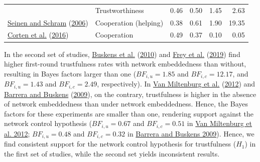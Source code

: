 \documentclass[
  11pt,
]{article}
\begin{document}
\begin{table}
\begin{tabular}[t]{llrrrr}
\addlinespace
 & Trustworthiness & 0.46 & 0.50 & 1.45 & 2.63\\
\addlinespace
\protect\hyperlink{ref-seinen_schram_social_2006}{Seinen and Schram} (\protect\hyperlink{ref-seinen_schram_social_2006}{2006}) & Cooperation (helping) & 0.38 & 0.61 & 1.90 & 19.35\\
\addlinespace
\protect\hyperlink{ref-corten_etal_reputation_2016}{Corten et al.} (\protect\hyperlink{ref-corten_etal_reputation_2016}{2016}) & Cooperation & 0.49 & 0.37 & 0.10 & 0.05\\
\bottomrule
\end{tabular}
\end{table}

In the second set of studies, \protect\hyperlink{ref-buskens_raub_veer_triads_2010}{Buskens et al.} (\protect\hyperlink{ref-buskens_raub_veer_triads_2010}{2010}) and \protect\hyperlink{ref-frey_buskens_investments_2019}{Frey et al.} (\protect\hyperlink{ref-frey_buskens_investments_2019}{2019}) find higher first-round trustfulness rates with network embeddedness than without, resulting in Bayes factors larger than one (\(BF_{i,u} = 1.85\) and \(BF_{i,c} = 12.17\), and \(BF_{i,u} = 1.43\) and \(BF_{i,c} = 2.49\), respectively).
In \protect\hyperlink{ref-miltenburg_buskens_triads_2012}{Van Miltenburg et al.} (\protect\hyperlink{ref-miltenburg_buskens_triads_2012}{2012}) and \protect\hyperlink{ref-barrera_buskens_third_2009}{Barrera and Buskens} (\protect\hyperlink{ref-barrera_buskens_third_2009}{2009}), on the contrary, trustfulness is higher in the absence of network embeddedness than under network embeddedness.
Hence, the Bayes factors for these experiments are smaller than one, rendering support against the network control hypothesis (\(BF_{i,u} = 0.67\) and \(BF_{i,c} = 0.51\) in \protect\hyperlink{ref-miltenburg_buskens_triads_2012}{Van Miltenburg et al. 2012}; \(BF_{i,u} = 0.48\) and \(BF_{i,c} = 0.32\) in \protect\hyperlink{ref-barrera_buskens_third_2009}{Barrera and Buskens 2009}).
Hence, we find consistent support for the network control hypothesis for trustfulness (\(H_1\)) in the first set of studies, while the second set yields inconsistent results.
\end{document}
